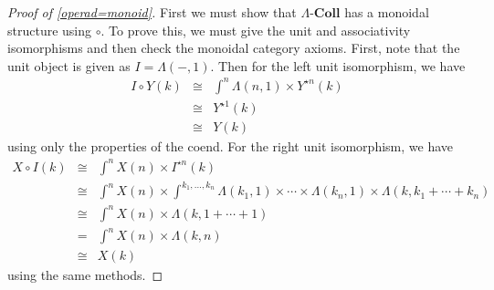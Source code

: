 \documentclass{amsbook} %
\newcommand{\mb}{\mathbf}
\numberwithin{section}{chapter}
\begin{document}
\begin{proof}[Proof of \ref{operad=monoid}]
First we must show that $\Lambda\mbox{-}\mb{Coll}$ has a monoidal structure using $\circ$.  To prove this, we must give the unit and associativity isomorphisms and then check the monoidal category axioms.  First, note that the unit object is given as $I = \mathbb{\Lambda}(-,1)$.  Then for the left unit isomorphism, we have
\[
\begin{array}{rcl}
I \circ Y (k) & \cong & \int^{n} \mathbb{\Lambda}(n,1) \times Y^{\star n}(k) \\
& \cong & Y^{\star 1}(k) \\
& \cong & Y(k)
\end{array}
\]
using only the properties of the coend.  For the right unit isomorphism, we have
\[
\begin{array}{rcl}
X \circ I (k) & \cong & \int^{n} X(n) \times I^{\star n}(k) \\
& \cong & \int^{n} X(n) \times \int^{k_{1}, \ldots, k_{n}} \mathbb{\Lambda}(k_{1},1) \times \cdots \times \mathbb{\Lambda}(k_{n},1) \times \mathbb{\Lambda}(k, k_{1} + \cdots + k_{n}) \\
& \cong & \int^{n} X(n) \times \mathbb{\Lambda}(k,1+ \cdots +1) \\
& = & \int^{n} X(n) \times \mathbb{\Lambda}(k,n) \\
& \cong & X(k)
\end{array}
\]
using the same methods.


\end{proof}
\end{document}
